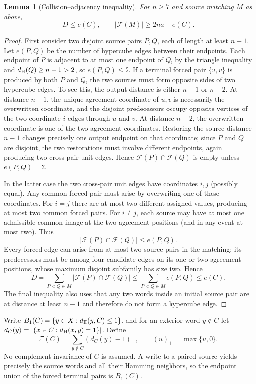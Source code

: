 \documentclass[11pt,a4paper]{article}
\newtheorem{lemma}[theorem]{Lemma}
\newcommand{\dist}{d_{\rm H}}
\begin{document}
\begin{lemma}[Collision--adjacency inequality]\label{lem:next-collision}
For $n\ge7$ and source matching $M$ as above,
\[
 \boxed{\quad D\le e(C),\qquad |\mathcal F(M)|\ge2na-e(C).\quad}
\]
\end{lemma}
\begin{proof}
First consider two disjoint source pairs $P,Q$, each of length at least $n-1$. Let $e(P,Q)$ be the number of hypercube edges between their endpoints. Each endpoint of $P$ is adjacent to at most one endpoint of $Q$, by the triangle inequality and $\dist(Q)\ge n-1>2$, so $e(P,Q)\le2$. If a terminal forced pair $\{u,v\}$ is produced by both $P$ and $Q$, the two sources must form opposite sides of two hypercube edges. To see this, the output distance is either $n-1$ or $n-2$. At distance $n-1$, the unique agreement coordinate of $u,v$ is necessarily the overwritten coordinate, and the disjoint predecessors occupy opposite vertices of the two coordinate-$i$ edges through $u$ and $v$. At distance $n-2$, the overwritten coordinate is one of the two agreement coordinates. Restoring the source distance $n-1$ changes precisely one output endpoint on that coordinate; since $P$ and $Q$ are disjoint, the two restorations must involve different endpoints, again producing two cross-pair unit edges. Hence $\mathcal F(P)\cap\mathcal F(Q)$ is empty unless $e(P,Q)=2$.

In the latter case the two cross-pair unit edges have coordinates $i,j$ (possibly equal). Any common forced pair must arise by overwriting one of these coordinates. For $i=j$ there are at most two different assigned values, producing at most two common forced pairs. For $i\ne j$, each source may have at most one admissible common image at the two agreement positions (and in any event at most two). Thus
\[
 |\mathcal F(P)\cap\mathcal F(Q)|\le e(P,Q).
\]
Every forced edge can arise from at most two source pairs in the matching: its predecessors must be among four candidate edges on its one or two agreement positions, whose maximum disjoint subfamily has size two. Hence
\[
 D=\sum_{P<Q\in M}|\mathcal F(P)\cap\mathcal F(Q)|
 \le\sum_{P<Q\in M}e(P,Q)\le e(C).
\]
The final inequality also uses that any two words inside an initial source pair are at distance at least $n-1$ and therefore do not form a hypercube edge.
\end{proof}



Write $B_1(C)=\{y\in X:\dist(y,C)\le1\}$, and for an exterior word $y\notin C$ let $d_C(y)=|\{x\in C:\dist(x,y)=1\}|$. Define
\[
 \Xi(C)=\sum_{y\notin C}(d_C(y)-1)_+,
 \qquad (u)_+=\max\{u,0\}.
\]
No complement invariance of $C$ is assumed. A write to a paired source yields precisely the source words and all their Hamming neighbors, so the endpoint union of the forced terminal pairs is $B_1(C)$.
\end{document}
